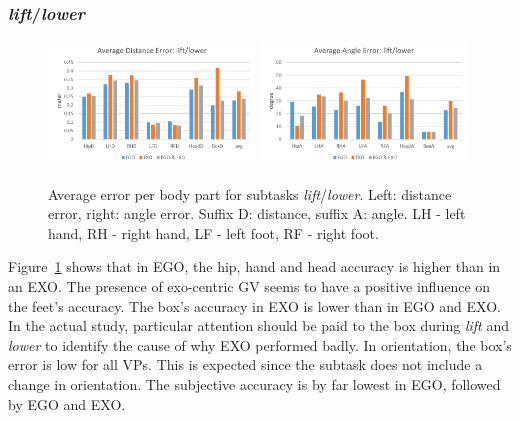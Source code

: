 \subsubsection{\textit{lift}/\textit{lower}}
\begin{figure}[H]
	\centering
	\includegraphics[width=0.49\textwidth]{figures/distanceErrorLiftLower.png}
	\includegraphics[width=0.49\textwidth]{figures/angleErrorLiftLower.png}
	\caption[Average error per body part for subtasks \textit{lift}/\textit{lower}.]{Average error per body part for subtasks \textit{lift}/\textit{lower}. Left: distance error, right: angle error. Suffix D: distance, suffix A: angle. LH - left hand, RH - right hand, LF - left foot, RF - right foot.}
	\label{fig:errorLiftLower}
\end{figure}
Figure~\ref{fig:errorLiftLower} shows that in EGO, the hip, hand and head accuracy is higher than in an EXO. The presence of exo-centric GV seems to have a positive influence on the feet's accuracy. The box's accuracy in EXO is lower than in EGO and EXO. In the actual study, particular attention should be paid to the box during \textit{lift} and \textit{lower} to identify the cause of why EXO performed badly. In orientation, the box's error is low for all VPs. This is expected since the subtask does not include a change in orientation.
The subjective accuracy is by far lowest in EGO, followed by EGO and EXO.

